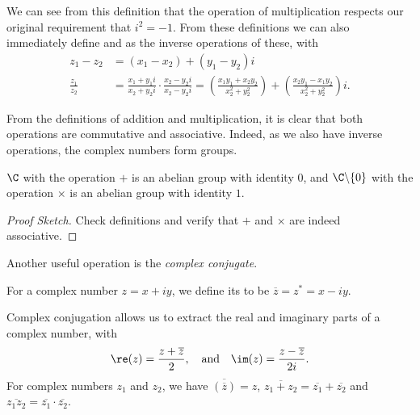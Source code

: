 We can see from this definition that the operation of multiplication respects our original requirement that $i^2 = -1$. From these definitions we can also immediately define  and  as the inverse operations of these, with
\begin{align*}
	z_1 - z_2 &= (x_1 - x_2) + (y_1 - y_2)i \\
	\frac{z_1}{z_2} &= \frac{x_1 + y_1 i}{x_2 + y_2 i} \cdot \frac{x_2 - y_2i}{x_2 - y_2 i} = \left(\frac{x_1y_1 + x_2 y_2}{x_2^2 + y_2^2}\right) + \left(\frac{x_2y_1 - x_1 y_2}{x_2^2 + y_2^2}\right)i.
\end{align*}

From the definitions of addition and multiplication, it is clear that both operations are commutative and associative. Indeed, as we also have inverse operations, the complex numbers form groups.

\begin{proposition}[$\C$ is a Group]
	$\C$ with the operation $+$ is an abelian group with identity $0$, and $\C \backslash \{0\}$ with the operation $\times$ is an abelian group with identity $1$.
\end{proposition}
\begin{proof}[Proof Sketch]
	Check definitions and verify that $+$ and $\times$ are indeed associative.
\end{proof}

Another useful operation is the \emph{complex conjugate}. 

\begin{definition}
  For a complex number $z = x + iy$, we define its  to be $\overline{z} = z^* = x - iy$.
\end{definition}

Complex conjugation allows us to extract the real and imaginary parts of a complex number, with
$$
\re(z) = \frac{z+ \overline{z}}{2}, \quad \text{and} \quad \im(z) = \frac{z - \overline{z}}{2i}.
$$
For complex numbers $z_1$ and $z_2$, we have $\overline{(\overline{z})} = z$, $\overline{z_1 + z_2} = \overline{z_1} + \overline{z_2}$ and $\overline{z_1 z_2} = \overline{z_1} \cdot  \overline{z_2}$.

